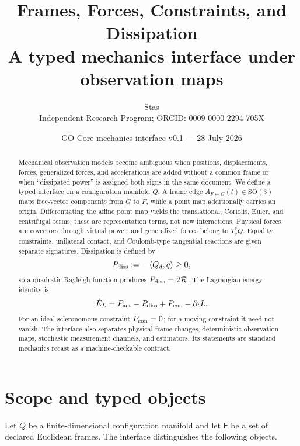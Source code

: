 \documentclass[11pt,a4paper]{article}
\title{\bfseries Frames, Forces, Constraints, and Dissipation\\
\large A typed mechanics interface under observation maps}
\author{Stas\\
\small Independent Research Program; ORCID: 0009-0000-2294-705X}
\date{GO Core mechanics interface v0.1 --- 28 July 2026}
\theoremstyle{definition}
\theoremstyle{plain}
\theoremstyle{remark}
\newcommand{\pair}[2]{\left\langle #1,#2\right\rangle}
\newcommand{\SO}{\mathrm{SO}}
\newcommand{\Rcal}{\mathcal R}
\begin{document}
\maketitle

\begin{center}
\end{center}

\begin{abstract}
Mechanical observation models become ambiguous when positions,
displacements, forces, generalized forces, and accelerations are added
without a common frame or when ``dissipated power'' is assigned both
signs in the same document. We define a typed interface on a
configuration manifold \(Q\). A frame edge
\(A_{F\leftarrow G}(t)\in\SO(3)\) maps free-vector components from
\(G\) to \(F\), while a point map additionally carries an origin.
Differentiating the affine point map yields the translational,
Coriolis, Euler, and centrifugal terms; these are representation
terms, not new interactions. Physical forces are covectors through
virtual power, and generalized forces belong to \(T_q^*Q\). Equality
constraints, unilateral contact, and Coulomb-type tangential reactions
are given separate signatures. Dissipation is defined by
\[
P_{\rm diss}:=-\pair{Q_d}{\dot q}\ge0,
\]
so a quadratic Rayleigh function produces
\(P_{\rm diss}=2\Rcal\). The Lagrangian energy identity is
\[
\dot E_L=P_{\rm act}-P_{\rm diss}+P_{\rm con}-\partial_tL.
\]
For an ideal scleronomous constraint \(P_{\rm con}=0\); for a moving
constraint it need not vanish. The interface also separates physical
frame changes, deterministic observation maps, stochastic
measurement channels, and estimators. Its statements are standard
mechanics recast as a machine-checkable contract.
\end{abstract}

\tableofcontents

\section{Scope and typed objects}

Let \(Q\) be a finite-dimensional configuration manifold and let
\(\mathsf F\) be a set of declared Euclidean frames. The interface
distinguishes the following objects.
\end{document}
